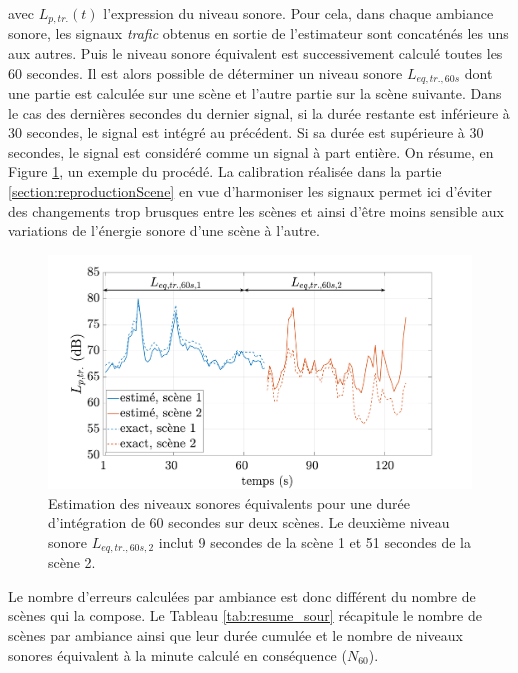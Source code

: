 avec $L_{p,tr.}(t)$ l'expression du niveau sonore.
Pour cela, dans chaque ambiance sonore, les signaux \textit{trafic} obtenus en sortie de l'estimateur sont concaténés les uns aux autres. Puis le niveau sonore équivalent est successivement calculé toutes les 60 secondes. Il est alors possible de déterminer un niveau sonore $L_{eq,tr.,60s}$ dont une partie est calculée sur une scène et l'autre partie sur la scène suivante. Dans le cas des dernières secondes du dernier signal, si la durée restante est inférieure à 30 secondes, le signal est intégré au précédent. Si sa durée est supérieure à 30 secondes, le signal est considéré comme un signal à part entière. On résume, en Figure \ref{fig:exempe_mae60}, un exemple du procédé. La calibration réalisée dans la partie \ref{section:reproductionScene} en vue d'harmoniser les signaux permet ici d'éviter des changements trop brusques entre les scènes et ainsi d'être moins sensible aux variations de l'énergie sonore d'une scène à l'autre.

\begin{figure}[h!]
\centering
\includegraphics[width=.9\linewidth]{./figures/resultats/Lp_mae.pdf}
\caption{Estimation des niveaux sonores équivalents pour une durée d'intégration de 60 secondes sur deux scènes. Le deuxième niveau sonore $L_{eq,tr.,60s,2}$ inclut 9 secondes de la scène 1 et 51 secondes de la scène 2.}
\label{fig:exempe_mae60}
\end{figure}

Le nombre d'erreurs calculées par ambiance est donc différent du nombre de scènes qui la compose. Le Tableau \ref{tab:resume_sour} récapitule le nombre de scènes par ambiance ainsi que leur durée cumulée et le nombre de niveaux sonores équivalent à la minute calculé en conséquence ($N_{60}$). 

